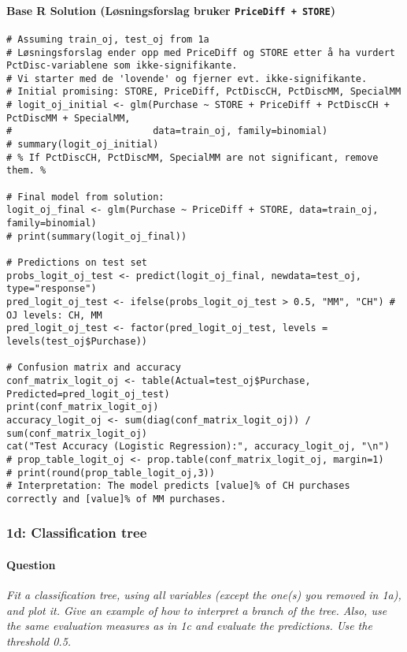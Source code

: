 \documentclass[12pt,a4paper]{article}
\newcommand{\Rcode}[1]{\texttt{#1}} %
\begin{document}
        \paragraph{Base R Solution (Løsningsforslag bruker \Rcode{PriceDiff + STORE})}
\begin{lstlisting}
# Assuming train_oj, test_oj from 1a
# Løsningsforslag ender opp med PriceDiff og STORE etter å ha vurdert PctDisc-variablene som ikke-signifikante.
# Vi starter med de 'lovende' og fjerner evt. ikke-signifikante.
# Initial promising: STORE, PriceDiff, PctDiscCH, PctDiscMM, SpecialMM
# logit_oj_initial <- glm(Purchase ~ STORE + PriceDiff + PctDiscCH + PctDiscMM + SpecialMM, 
#                         data=train_oj, family=binomial)
# summary(logit_oj_initial) 
# % If PctDiscCH, PctDiscMM, SpecialMM are not significant, remove them. %

# Final model from solution:
logit_oj_final <- glm(Purchase ~ PriceDiff + STORE, data=train_oj, family=binomial)
# print(summary(logit_oj_final))

# Predictions on test set
probs_logit_oj_test <- predict(logit_oj_final, newdata=test_oj, type="response")
pred_logit_oj_test <- ifelse(probs_logit_oj_test > 0.5, "MM", "CH") # OJ levels: CH, MM
pred_logit_oj_test <- factor(pred_logit_oj_test, levels = levels(test_oj$Purchase))

# Confusion matrix and accuracy
conf_matrix_logit_oj <- table(Actual=test_oj$Purchase, Predicted=pred_logit_oj_test)
print(conf_matrix_logit_oj)
accuracy_logit_oj <- sum(diag(conf_matrix_logit_oj)) / sum(conf_matrix_logit_oj)
cat("Test Accuracy (Logistic Regression):", accuracy_logit_oj, "\n")
# prop_table_logit_oj <- prop.table(conf_matrix_logit_oj, margin=1)
# print(round(prop_table_logit_oj,3))
# Interpretation: The model predicts [value]% of CH purchases correctly and [value]% of MM purchases.
\end{lstlisting}

    \subsubsection{1d: Classification tree}
        \paragraph{Question}
        \textit{Fit a classification tree, using all variables (except the one(s) you removed in 1a), and plot it. Give an example of how to interpret a branch of the tree. Also, use the same evaluation measures as in 1c and evaluate the predictions. Use the threshold 0.5.}
\end{document}
